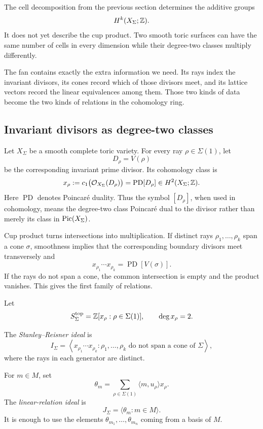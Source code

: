 The cell decomposition from the previous section determines the
additive groups
\[
H^k(X_\Sigma;\mathbb{Z}).
\]
It does not yet describe the cup product. Two smooth toric surfaces can
have the same number of cells in every dimension while their
degree-two classes multiply differently.

The fan contains exactly the extra information we need. Its rays index
the invariant divisors, its cones record which of those divisors meet,
and its lattice vectors record the linear equivalences among them.
Those two kinds of data become the two kinds of relations in the
cohomology ring.

\subsection{Invariant divisors as degree-two classes}

Let \(X_\Sigma\) be a smooth complete toric variety. For every ray
\(\rho\in\Sigma(1)\), let
\[
D_\rho=V(\rho)
\]
be the corresponding invariant prime divisor. Its cohomology class is
\[
x_\rho
:=
c_1\bigl(\mathcal O_{X_\Sigma}(D_\rho)\bigr)
=
\operatorname{PD}[D_\rho]
\in H^2(X_\Sigma;\mathbb{Z}).
\]
Here \(\operatorname{PD}\) denotes Poincar\'e duality. Thus the symbol
\([D_\rho]\), when used in cohomology, means the degree-two class
Poincar\'e dual to the divisor rather than merely its class in
\(\operatorname{Pic}(X_\Sigma)\).

Cup product turns intersections into multiplication. If distinct rays
\(\rho_1,\ldots,\rho_k\) span a cone \(\sigma\), smoothness implies
that the corresponding boundary divisors meet transversely and
\[
x_{\rho_1}\cdots x_{\rho_k}
=
\operatorname{PD}[V(\sigma)].
\]
If the rays do not span a cone, the common intersection is empty and
the product vanishes. This gives the first family of relations.

\begin{definition}
\label{def:two-fan-ideals}
Let
\[
S^{\mathrm{top}}_\Sigma
=
\mathbb{Z}[x_\rho:\rho\in\Sigma(1)],
\qquad
\deg x_\rho=2.
\]

The \emph{Stanley--Reisner ideal} is
\[
I_\Sigma
=
\left\langle
x_{\rho_1}\cdots x_{\rho_k}:
\rho_1,\ldots,\rho_k
\text{ do not span a cone of }\Sigma
\right\rangle,
\]
where the rays in each generator are distinct.

For \(m\in M\), set
\[
\theta_m
=
\sum_{\rho\in\Sigma(1)}
\langle m,u_\rho\rangle x_\rho.
\]
The \emph{linear-relation ideal} is
\[
J_\Sigma
=
\langle\theta_m:m\in M\rangle.
\]
It is enough to use the elements \(\theta_{m_1},\ldots,
\theta_{m_n}\) coming from a basis of \(M\).
\end{definition}

